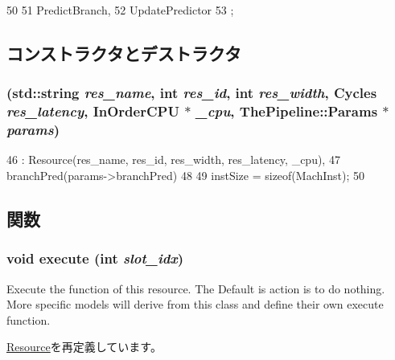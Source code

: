 \begin{DoxyCode}
50                  {
51         PredictBranch,
52         UpdatePredictor
53     };
\end{DoxyCode}


\subsection{コンストラクタとデストラクタ}
\hypertarget{classBranchPredictor_a8df166d242ec66fcc54ae779bb1f955d}{
\subsubsection[{BranchPredictor}]{ (std::string {\em res\_\-name}, \/  int {\em res\_\-id}, \/  int {\em res\_\-width}, \/  {\bf Cycles} {\em res\_\-latency}, \/  {\bf InOrderCPU} $\ast$ {\em \_\-cpu}, \/  {\bf ThePipeline::Params} $\ast$ {\em params})}}
\label{classBranchPredictor_a8df166d242ec66fcc54ae779bb1f955d}



\begin{DoxyCode}
46     : Resource(res_name, res_id, res_width, res_latency, _cpu),
47       branchPred(params->branchPred)
48 {
49     instSize = sizeof(MachInst);
50 }
\end{DoxyCode}


\subsection{関数}
\hypertarget{classBranchPredictor_a7b7fff82f8c9cbdb02add1346f60bb9e}{
\subsubsection[{execute}]{\setlength{\rightskip}{0pt plus 5cm}void execute (int {\em slot\_\-idx})}}
\label{classBranchPredictor_a7b7fff82f8c9cbdb02add1346f60bb9e}
Execute the function of this resource. The Default is action is to do nothing. More specific models will derive from this class and define their own execute function. 

\hyperlink{classResource_a39af49c5568d1db3f53c12d7d6914c32}{Resource}を再定義しています。


